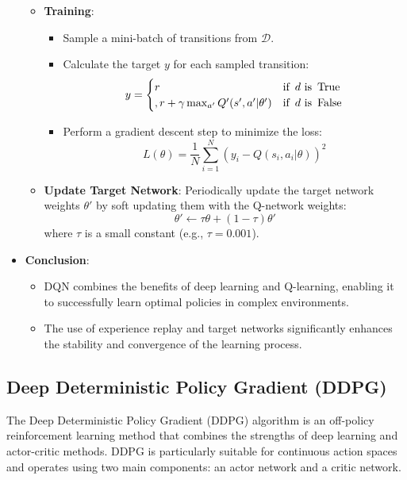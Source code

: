 \documentclass[letterpaper]{article}
\begin{document}
\begin{itemize}
\begin{itemize}
            \item \textbf{Training}:
                \begin{itemize}
                    \item Sample a mini-batch of transitions from \( \mathcal{D} \).
                    \item Calculate the target \( y \) for each sampled transition:
                    \[
                    y = 
                    \begin{cases}
                    r & \text{if\, } d \text{ is \,True} \\ ,
                    r + \gamma \max_{a'} Q'(s', a'|\theta') & \text{if \,} d \text{ is\, False}
                    \end{cases}
                    \]
                    \item Perform a gradient descent step to minimize the loss:
                    \[
                    L(\theta) = \frac{1}{N} \sum_{i=1}^N (y_i - Q(s_i, a_i|\theta))^2
                    \]
                \end{itemize}

            \item \textbf{Update Target Network}: Periodically update the target network weights \( \theta' \) by soft updating them with the Q-network weights:
            \[
            \theta' \leftarrow \tau \theta + (1 - \tau) \theta'
            \]
            where \( \tau \) is a small constant (e.g., \( \tau = 0.001 \)).
        \end{itemize}

    \item \textbf{Conclusion}:
        \begin{itemize}
            \item DQN combines the benefits of deep learning and Q-learning, enabling it to successfully learn optimal policies in complex environments.
            \item The use of experience replay and target networks significantly enhances the stability and convergence of the learning process.
        \end{itemize}
\end{itemize}

\subsection{Deep Deterministic Policy Gradient (DDPG)}

The Deep Deterministic Policy Gradient (DDPG) algorithm is an off-policy reinforcement learning method that combines the strengths of deep learning and actor-critic methods. DDPG is particularly suitable for continuous action spaces and operates using two main components: an actor network and a critic network.
\end{document}
